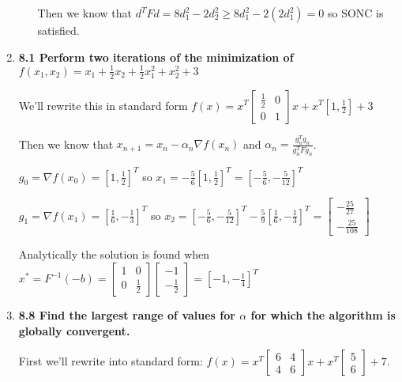 \documentclass[10pt,a4paper]{article}
\begin{document}
\begin{enumerate}
\begin{enumerate}
        Then we know that $d^T Fd = 8d_1^2 - 2d_2^2  \geq 8d_1^2 - 2(2d_1^2) =0$ so SONC is satisfied.
        
    \end{enumerate}

    \item \textbf{8.1 Perform two iterations of the minimization of $f(x_1, x_2) = x_1 + \frac{1}{2}x_2 + \frac{1}{2}x_1^2 + x_2^2 +3$}
    
        We'll rewrite this in standard form $f(x) = x^T\begin{bmatrix}\frac{1}{2} & 0 \\ 0 & 1\end{bmatrix}x + x^T[1, \frac{1}{2}] + 3$

        Then we know that $x_{n+1}  = x_n - \alpha_n \nabla f(x_n)$ and $\alpha_n = \frac{g_n^Tg_n}{g_n^TFg_n}$.
        
        $g_0 = \nabla f(x_0) = [1, \frac{1}{2}]^T$ so $x_1 = -\frac{5}{6}[1, \frac{1}{2}]^T = [-\frac{5}{6} ,  -\frac{5}{12}]^T$
        
        $g_1 = \nabla f(x_1) = [\frac{1}{6}, -\frac{1}{3}]^T$ so $x_2 = [-\frac{5}{6}, -\frac{5}{12}]^T -\frac{5}{9}[\frac{1}{6}, -\frac{1}{3}]^T = \begin{bmatrix}-\frac{25}{27} \\ -\frac{25}{108}\end{bmatrix}$
        
        Analytically the solution is found when $x^* = F^{-1} (-b) = \begin{bmatrix} 1& 0 \\ 0 &\frac{1}{2}\end{bmatrix} \begin{bmatrix}-1 \\ -\frac{1}{2}\end{bmatrix} = [-1, - \frac{1}{4} ]^T$
        
    \item \textbf{8.8 Find the largest range of values for $\alpha$ for which the algorithm is globally convergent.}
    
        First we'll rewrite into standard form: $f(x) = x^T \begin{bmatrix} 6 & 4 \\ 4 & 6\end{bmatrix}x + x^T\begin{bmatrix} 5 \\ 6\end{bmatrix} + 7$.


\end{enumerate}
\end{document}
